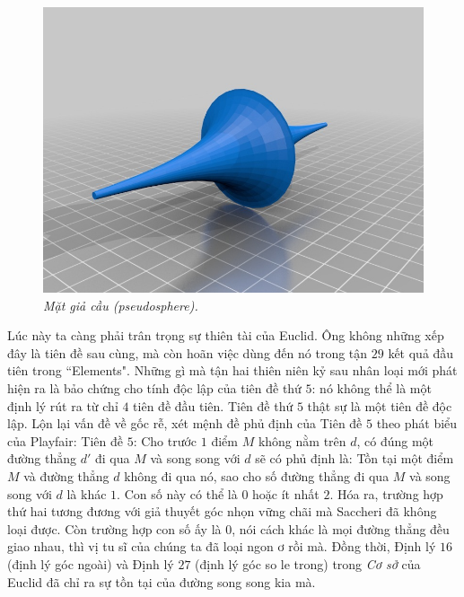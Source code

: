 \begin{multicols}{2}
	\begin{figure}[H]
		\vspace*{5pt}
		\centering
		\captionsetup{labelformat= empty, justification=centering}
		\includegraphics[width= 1\linewidth]{Pseudosphere.jpg}
		\caption{\small\textit{\color{lichsutoanhoc}Mặt giả cầu (pseudosphere).}}
		\vspace*{-10pt}
	\end{figure}
	Lúc này ta càng phải trân trọng sự thiên tài của Euclid. Ông không những xếp đây là tiên đề sau cùng, mà còn hoãn việc dùng đến nó trong tận $29$ kết quả đầu tiên trong ``Elements". Những gì mà tận hai thiên niên kỷ sau nhân loại mới phát hiện ra là bảo chứng cho tính độc lập của tiên đề thứ $5$: nó không thể là một định lý rút ra từ chỉ $4$ tiên đề đầu tiên. Tiên đề thứ $5$ thật sự là một tiên đề độc lập.
	\vskip 0.1cm
	Lộn lại vấn đề về gốc rễ, xét mệnh đề phủ định của Tiên đề $5$ theo phát biểu của Playfair:
	\vskip 0.1cm
	Tiên đề $5$: Cho trước $1$ điểm $M$ không nằm trên $d$, có đúng một đường thẳng $d'$ đi qua $M$ và song song với $d$
	\vskip 0.1cm
	sẽ có phủ định là: 
	\vskip 0.1cm
	Tồn tại một điểm $M$ và đường thẳng $d$ không đi qua nó, sao cho số đường thẳng đi qua $M$ và song song với $d$ là khác $1$. Con số này có thể là $0$ hoặc ít nhất $2$. 
	\vskip 0.1cm
	Hóa ra, trường hợp thứ hai tương đương với giả thuyết góc nhọn vững chãi mà Saccheri đã không loại được. Còn trường hợp con số ấy là $0$, nói cách khác là mọi đường thẳng đều giao nhau, thì vị tu sĩ của chúng ta đã loại ngon ơ rồi mà. Đồng thời, Định lý $16$ (định lý góc ngoài) và  Định lý $27$ (định lý góc so le trong) trong \textit{Cơ sở} của Euclid đã chỉ ra sự tồn tại của đường song song kia mà.

\end{multicols}
